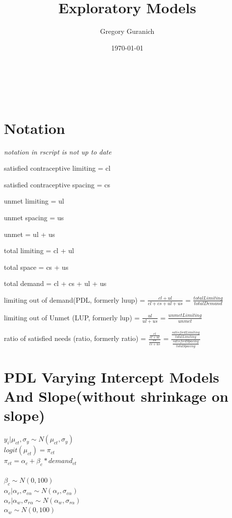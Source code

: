 \documentclass[12pt]{article}
\begin{document}
\title{Exploratory Models}
\author{Gregory Guranich}
\date{\today}
\maketitle
\tableofcontents
\hfill \break
\hfill \break
\\
\\

\newpage

\section{Notation}
\indent\textit{notation in rscript is not up to date}
\begin{description}
\item{satisfied contraceptive limiting = } cl
\item{satisfied contraceptive spacing = } cs
\item{unmet limiting = } ul
\item{unmet spacing = } us
\item{unmet = } ul + us
\item{total limiting = } cl + ul
\item{total space = } cs + us
\item{total demand = } cl + cs + ul + us
\item{limiting out of demand(PDL, formerly luup) = } $ \frac{cl + ul}{cl + cs + ul + us} $ = $ \frac{total Limiting}{total Demand} $
\item{limiting out of Unmet (LUP, formerly lup) = } $\frac{ul}{ul+us} $ = $ \frac{unmetLimiting}{unmet} $
\item{ratio of satisfied needs (ratio, formerly ratio) = } $\frac{\frac{cl}{cl+ul}}{\frac{cs}{cs+us}} $ = $\frac{\frac{satisfied Limiting}{total Limiting}}{\frac{satisfied Spacing}{total Spacing}} $ 
\item{}
\end{description}

\newpage

\section{PDL Varying Intercept Models And Slope(without shrinkage on slope)}
$ y_i|\mu_{ct},\sigma_y \sim N(\mu_{ct}, \sigma_y) $ \\
$ logit(\mu_{ct})=  \pi_{ct} $\\
$ \pi_{ct} = \alpha_c + \beta_c*demand_{ct} $\\
\\
$ \beta_c \sim N(0,100) $ \\
$ \alpha_c|\alpha_r,\sigma_{c\alpha} \sim N(\alpha_r,\sigma_{c\alpha}) $ \\
$ \alpha_r|\alpha_w,\sigma_{r\alpha} \sim N(\alpha_w, \sigma_{r\alpha}) $\\
$ \alpha_w \sim N(0, 100) $\\
\end{document}
